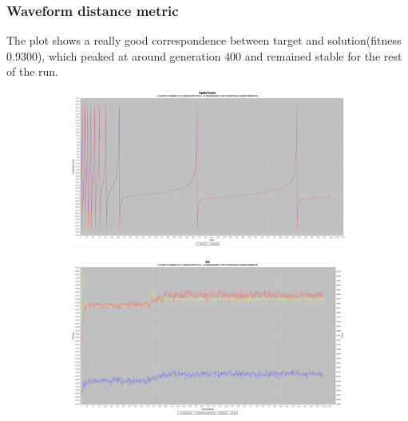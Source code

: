 \documentclass[10pt]{article}
\begin{document}
		\subsubsection{Waveform distance metric}
			The plot shows a really good correspondence between target and solution(fitness $0.9300$), which peaked at around generation $400$ and remained stable for the rest of the run.
			\begin{figure}[H]
				\centering
					\begin{subfigure}{.5\textwidth}
						\centering
						\includegraphics[width=\linewidth]{./../images/izzy4/wave/plot.png}

						\label{fig:sub12a}
					\end{subfigure}%
					\begin{subfigure}{.5\textwidth}
						\centering
						\includegraphics[width=\linewidth]{./../images/izzy4/wave/prog.png}
						
						\label{fig:sub12b}
					\end{subfigure}
					
					\label{fig:plot12}
			\end{figure}
\end{document}
